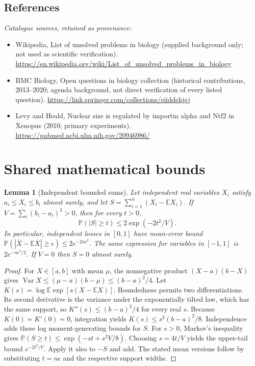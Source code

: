 \documentclass[11pt]{article}
\newcommand{\E}{\mathbb E}
\newcommand{\Prob}{\mathbb P}
\DeclareMathOperator{\Var}{Var}
\providecommand{\E}{\mathbb E}
\providecommand{\Prob}{\mathbb P}
\providecommand{\Var}{\operatorname{Var}}
\newtheorem{sharedlemma}{Lemma}[section]
\begin{document}
\subsection{References}
\noindent\emph{Catalogue sources, retained as provenance:}
\begin{itemize}
\item Wikipedia, List of unsolved problems in biology (supplied background only; not used as scientific verification). \url{https://en.wikipedia.org/wiki/List_of_unsolved_problems_in_biology}
\item BMC Biology, Open questions in biology collection (historical contributions, 2013--2020; agenda background, not direct verification of every listed question). \url{https://link.springer.com/collections/eiiddehjgj}
\item Levy and Heald, Nuclear size is regulated by importin alpha and Ntf2 in Xenopus (2010; primary experiments). \url{https://pubmed.ncbi.nlm.nih.gov/20946986/}
\end{itemize}
\clearpage


\appendix
\section{Shared mathematical bounds}\label{app:bounds}
\begin{sharedlemma}[Independent bounded sums]\label{lem:bounded}
Let independent real variables $X_i$ satisfy $a_i\leq X_i\leq b_i$ almost surely,
and let $S=\sum_{i=1}^n(X_i-\E X_i)$. If
$V=\sum_i(b_i-a_i)^2>0$, then for every $t>0$,
\[
 \Prob(|S|\geq t)\leq 2\exp(-2t^2/V).
\]
In particular, independent losses in $[0,1]$ have mean-error bound
$\Prob(|\overline X-\E\overline X|\geq\epsilon)
\leq2e^{-2n\epsilon^2}$. The same expression for variables in $[-1,1]$
is $2e^{-n\epsilon^2/2}$. If $V=0$ then $S=0$ almost surely.
\end{sharedlemma}
\begin{proof}
For $X\in[a,b]$ with mean $\mu$, the nonnegative product
$(X-a)(b-X)$ gives
$\Var X\leq(\mu-a)(b-\mu)\leq(b-a)^2/4$.
Let $K(s)=\log\E\exp[s(X-\E X)]$.
Boundedness permits two differentiations. Its second derivative is the variance
under the exponentially tilted law, which has the same support, so
$K''(s)\leq(b-a)^2/4$ for every real $s$.
Because $K(0)=K'(0)=0$, integration yields
$K(s)\leq s^2(b-a)^2/8$.
Independence adds these log moment-generating bounds for $S$.
For $s>0$, Markov's inequality gives
$\Prob(S\geq t)\leq\exp(-st+s^2V/8)$.
Choosing $s=4t/V$ yields the upper-tail bound $e^{-2t^2/V}$.
Apply it also to $-S$ and add. The stated mean versions follow by substituting
$t=n\epsilon$ and the respective support widths.
\end{proof}
\end{document}
